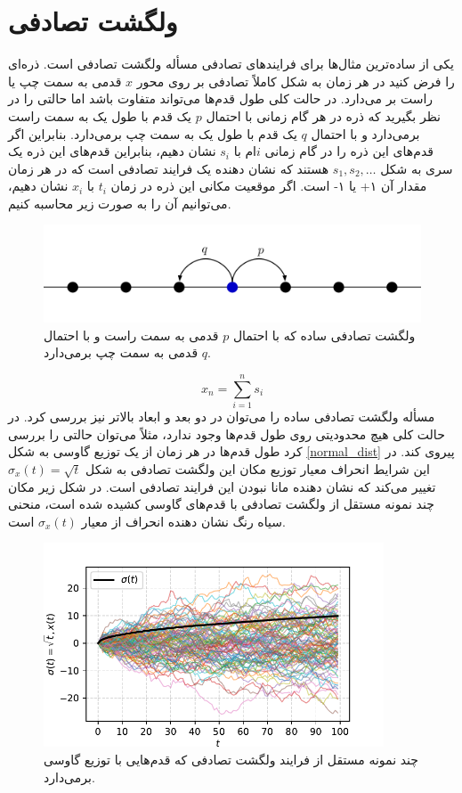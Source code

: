 \section{ولگشت تصادفی}
یکی از ساده‌ترین مثال‌ها برای فرایندهای تصادفی مسأله ولگشت تصادفی است. ذره‌ای را فرض کنید در هر زمان به شکل کاملاً تصادفی بر روی محور $x$ قدمی به سمت چپ یا راست بر می‌دارد.
در حالت کلی طول قدم‌ها می‌تواند متفاوت باشد اما حالتی را در نظر بگیرید که ذره در هر گام زمانی با احتمال $p$ یک قدم با طول یک به سمت راست برمی‌دارد و با احتمال $q$ یک قدم با طول یک به سمت چپ برمی‌دارد. بنابراین اگر قدم‌های این ذره را در گام زمانی $i$ام با $s_{i}$ نشان دهیم، بنابراین قدم‌های این ذره یک سری به شکل $s_{1}, s_{2}, \dotsc$ هستند که نشان دهنده یک فرایند تصادفی است که در هر زمان مقدار آن ۱+  یا ۱- است. اگر موقعیت مکانی این ذره در زمان $t_{i}$ با $x_{i}$ نشان دهیم، می‌توانیم آن را به صورت زیر محاسبه کنیم.
\begin{figure}[H]
  \centering
  \includegraphics[scale=1]{images/simple_rw.png}
  \caption{ولگشت تصادفی ساده که با احتمال $p$ قدمی به سمت راست و با احتمال $q$ قدمی به سمت چپ برمی‌دارد.}
\end{figure}
\FloatBarrier
$$
  x_{n}=\sum_{i=1}^{n} s_{i}
$$
مسأله ولگشت تصادفی ساده را می‌توان در دو بعد و ابعاد بالاتر نیز بررسی کرد. در حالت کلی هیچ محدودیتی روی طول قدم‌ها وجود ندارد، مثلاً می‌توان حالتی را بررسی کرد طول قدم‌ها در هر زمان از یک توزیع گاوسی به شکل \ref{normal_dist} پیروی کند. در این شرایط انحراف معیار توزیع مکان این ولگشت تصادفی به شکل $\sigma_x \left( t \right) = \sqrt{t}$ تغییر می‌کند که نشان دهنده مانا نبودن این فرایند تصادفی است. در شکل زیر مکان چند نمونه مستقل از ولگشت تصادفی با قدم‌های گاوسی کشیده شده است، منحنی سیاه رنگ نشان دهنده انحراف از معیار $\sigma_x \left( t \right)$ است.
\begin{figure}[H]
  \centering
  \includegraphics[width=0.9\textwidth]{images/normal_rw.pdf}
  \caption{چند نمونه مستقل از فرایند ولگشت تصادفی که قدم‌هایی با توزیع گاوسی برمی‌دارد.}
\end{figure}
\FloatBarrier

